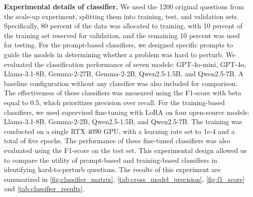 \textbf{Experimental details of classifier.} We used the 1200 original questions from the scale-up experiment, splitting them into training, test, and validation sets. Specifically, 80 percent of the data was allocated to training, with 10 percent of the training set reserved for validation, and the remaining 10 percent was used for testing. For the prompt-based classifiers, we designed specific prompts to guide the models in determining whether a problem was hard to perturb. We evaluated the classification performance of seven models: GPT-4o-mini, GPT-4o, Llama-3.1-8B, Gemma-2-27B, Gemma-2-2B, Qwen2.5-1.5B, and Qwen2.5-7B. A baseline configuration without any classifier was also included for comparison. The effectiveness of these classifiers was measured using the F1-score with beta equal to 0.5, which prioritizes precision over recall. For the training-based classifiers, we used supervised fine-tuning with LoRA on four open-source models: Llama-3.1-8B, Gemma-2-2B, Qwen2.5-1.5B, and Qwen2.5-7B. The training was conducted on a single RTX 4090 GPU, with a learning rate set to 1e-4 and a total of five epochs. The performance of these fine-tuned classifiers was also evaluated using the F1-score on the test set. This experimental design allowed us to compare the utility of prompt-based and training-based classifiers in identifying hard-to-perturb questions. The results of this experiment are summarized in \autoref{fig:classifier_matrix}, \autoref{tab:cross_model_precision}, \autoref{fig:f1_score} and \autoref{tab:classifier_results}.

